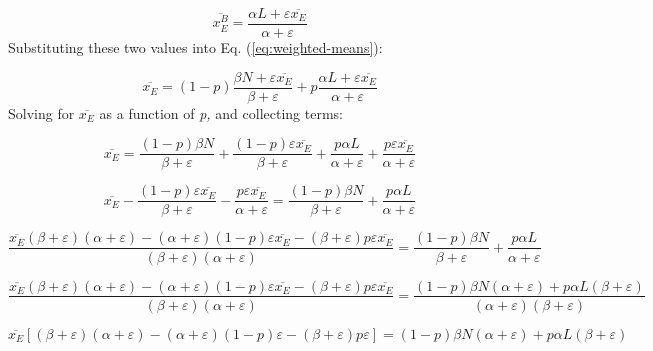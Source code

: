 \begin{equation}
\overline{x_{E}^{B}}=\frac{\alpha L+\varepsilon\overline{x_{E}}}{\alpha+\varepsilon}
\end{equation}
Substituting these two values into Eq. (\ref{eq:weighted-means}):

\begin{equation}
\overline{x_{E}}=(1-p)\frac{\beta N+\varepsilon\overline{x_{E}}}{\beta+\varepsilon}+p\frac{\alpha L+\varepsilon\overline{x_{E}}}{\alpha+\varepsilon}
\end{equation}
Solving for $\overline{x_{E}}$ as a function of \emph{p, }and collecting
terms:

\begin{equation}
\overline{x_{E}}=\frac{(1-p)\beta N}{\beta+\varepsilon}+\frac{(1-p)\varepsilon\overline{x_{E}}}{\beta+\varepsilon}+\frac{p\alpha L}{\alpha+\varepsilon}+\frac{p\varepsilon\overline{x_{E}}}{\alpha+\varepsilon}
\end{equation}

\begin{equation}
\overline{x_{E}}-\frac{(1-p)\varepsilon\overline{x_{E}}}{\beta+\varepsilon}-\frac{p\varepsilon\overline{x_{E}}}{\alpha+\varepsilon}=\frac{(1-p)\beta N}{\beta+\varepsilon}+\frac{p\alpha L}{\alpha+\varepsilon}
\end{equation}

\begin{equation}
\frac{\overline{x_{E}}(\beta+\varepsilon)(\alpha+\varepsilon)-(\alpha+\varepsilon)(1-p)\varepsilon\overline{x_{E}}-(\beta+\varepsilon)p\varepsilon\overline{x_{E}}}{(\beta+\varepsilon)(\alpha+\varepsilon)}=\frac{(1-p)\beta N}{\beta+\varepsilon}+\frac{p\alpha L}{\alpha+\varepsilon}
\end{equation}

\begin{equation}
\frac{\overline{x_{E}}(\beta+\varepsilon)(\alpha+\varepsilon)-(\alpha+\varepsilon)(1-p)\varepsilon\overline{x_{E}}-(\beta+\varepsilon)p\varepsilon\overline{x_{E}}}{(\beta+\varepsilon)(\alpha+\varepsilon)}=\frac{(1-p)\beta N(\alpha+\varepsilon)+p\alpha L(\beta+\varepsilon)}{(\alpha+\varepsilon)(\beta+\varepsilon)}
\end{equation}

\begin{equation}
\overline{x_{E}}[(\beta+\varepsilon)(\alpha+\varepsilon)-(\alpha+\varepsilon)(1-p)\varepsilon-(\beta+\varepsilon)p\varepsilon]=(1-p)\beta N(\alpha+\varepsilon)+p\alpha L(\beta+\varepsilon)
\end{equation}

